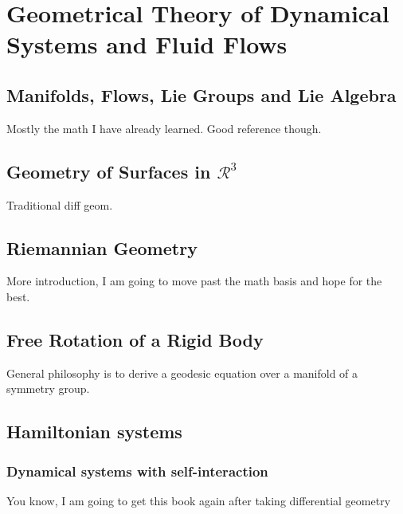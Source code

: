 \chapter{Geometrical Theory of Dynamical Systems and Fluid Flows}

\section{Manifolds, Flows, Lie Groups and Lie Algebra}

Mostly the math I have already learned. Good reference though.

\section{Geometry of Surfaces in $\mathcal{R}^3$}

Traditional diff geom.

\section{Riemannian Geometry}

More introduction, I am going to move past the math basis and hope for the best.

\section{Free Rotation of a Rigid Body}
General philosophy is to derive a geodesic equation over a manifold of a symmetry group.


\section{Hamiltonian systems}

\subsection{Dynamical systems with self-interaction}
You know, I am going to get this book again after taking differential geometry

